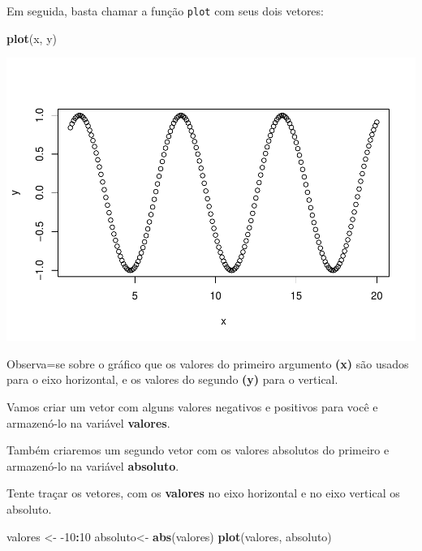 \documentclass[
]{book}
\newenvironment{Shaded}{\begin{snugshade}}{\end{snugshade}}
\newcommand{\DecValTok}[1]{\textcolor[rgb]{0.00,0.00,0.81}{#1}}
\newcommand{\KeywordTok}[1]{\textcolor[rgb]{0.13,0.29,0.53}{\textbf{#1}}}
\newcommand{\NormalTok}[1]{#1}
\newcommand{\OperatorTok}[1]{\textcolor[rgb]{0.81,0.36,0.00}{\textbf{#1}}}
\newcommand{\StringTok}[1]{\textcolor[rgb]{0.31,0.60,0.02}{#1}}
\begin{document}
Em seguida, basta chamar a função \texttt{plot} com seus dois vetores:

\begin{Shaded}
\begin{Highlighting}[]
\KeywordTok{plot}\NormalTok{(x, y)}
\end{Highlighting}
\end{Shaded}

\includegraphics{TudodoR_files/figure-latex/unnamed-chunk-46-1.pdf}

Observa=se sobre o gráfico que os valores do primeiro argumento \textbf{(x)} são usados para o eixo horizontal, e os valores do segundo \textbf{(y)} para o vertical.

Vamos criar um vetor com alguns valores negativos e positivos para você e armazenó-lo na variável \textbf{valores}.

Também criaremos um segundo vetor com os valores absolutos do primeiro e armazenó-lo na variável \textbf{absoluto}.

Tente traçar os vetores, com os \textbf{valores} no eixo horizontal e no eixo vertical os absoluto.

\begin{Shaded}
\begin{Highlighting}[]
\NormalTok{valores <-}\StringTok{ }\DecValTok{-10}\OperatorTok{:}\DecValTok{10}
\NormalTok{absoluto<-}\StringTok{ }\KeywordTok{abs}\NormalTok{(valores)}
\KeywordTok{plot}\NormalTok{(valores, absoluto)}
\end{Highlighting}
\end{Shaded}
\end{document}
